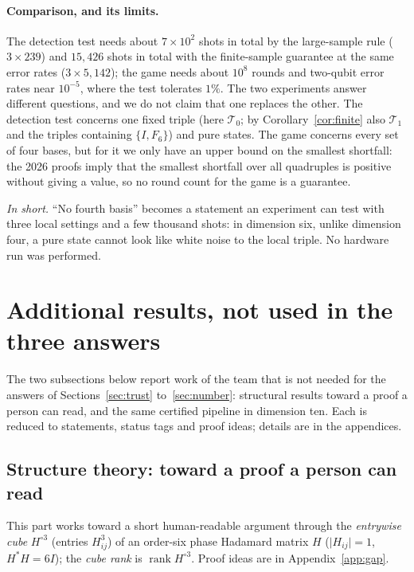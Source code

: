 \documentclass[11pt]{article}
\newcommand{\abs}[1]{\lvert #1\rvert}
\newcommand{\Tz}{\mathcal{T}_0}          %
\newcommand{\To}{\mathcal{T}_1}          %
\newcommand{\hcube}[1]{#1^{\circ 3}}     %
\theoremstyle{definition}
\theoremstyle{remark}
\begin{document}
\paragraph{Comparison, and its limits.} The detection test needs about $7\times10^{2}$ shots in total by the
large-sample rule ($3\times239$) and $15{,}426$ shots in total with the finite-sample guarantee at the same error
rates ($3\times5{,}142$); the game needs about $10^{8}$ rounds and two-qubit error rates near $10^{-5}$, where the test
tolerates $1\%$. The two experiments answer different questions, and we do not claim that one replaces the other.
The detection test concerns one fixed triple (here $\Tz$; by Corollary~\ref{cor:finite} also $\To$ and the triples
containing $\{I,F_6\}$) and pure states. The game concerns every set of four bases, but for it we only have an upper
bound on the smallest shortfall: the 2026 proofs imply that the smallest shortfall over all quadruples is positive
without giving a value, so no round count for the game is a guarantee.

\smallskip\noindent\emph{In short.} ``No fourth basis'' becomes a statement an experiment can
test with three local settings and a few thousand shots: in dimension six, unlike dimension four, a pure state cannot
look like white noise to the local triple. No hardware run was performed.

\section{Additional results, not used in the three answers}\label{sec:additional}

The two subsections below report work of the team that is not needed for the answers of
Sections~\ref{sec:trust} to~\ref{sec:number}: structural results toward a proof a person can read,
and the same certified pipeline in dimension ten. Each is reduced to statements,
status tags and proof ideas; details are in the appendices.


\subsection{Structure theory: toward a proof a person can read}\label{sec:structure}

This part works toward a short human-readable argument through the \emph{entrywise cube} $\hcube{H}$ (entries
$H_{ij}^3$) of an order-six phase Hadamard matrix $H$ ($\abs{H_{ij}}=1$, $H^\ast H=6I$); the \emph{cube rank} is
$\operatorname{rank}\hcube{H}$. Proof ideas are in Appendix~\ref{app:gap}.
\end{document}
